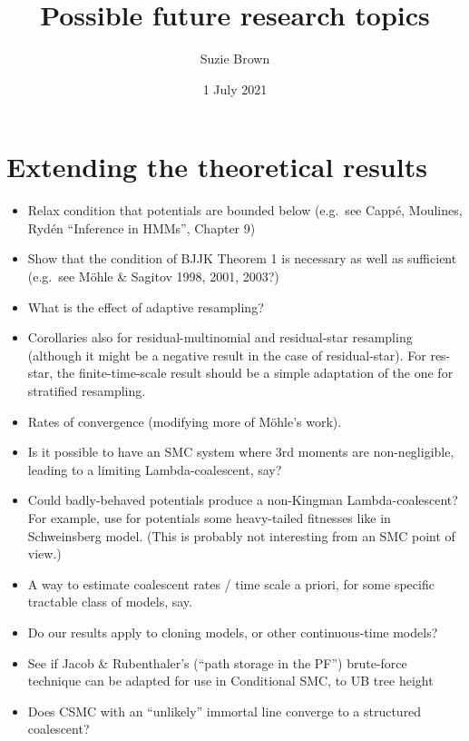 \documentclass{article}
\title{Possible future research topics}
\author{Suzie Brown}
\date{1 July 2021}
\begin{document}
\maketitle
\thispagestyle{fancy}

\section*{Extending the theoretical results}
\begin{itemize}
\item Relax condition that potentials are bounded below (e.g.\ see Capp\'e, Moulines, Ryd\'en ``Inference in HMMs'', Chapter 9)
\item Show that the condition of BJJK Theorem 1 is necessary as well as sufficient (e.g.\ see M\"ohle \& Sagitov 1998, 2001, 2003?)
\item What is the effect of adaptive resampling?
\item Corollaries also for residual-multinomial and residual-star resampling (although it might be a negative result in the case of residual-star). For res-star, the finite-time-scale result should be a simple adaptation of the one for stratified resampling.
\item Rates of convergence (modifying more of M\"ohle's work).
\item Is it possible to have an SMC system where 3rd moments are non-negligible, leading to a limiting Lambda-coalescent, say?
\item Could badly-behaved potentials produce a non-Kingman Lambda-coalescent? For example, use for potentials some heavy-tailed fitnesses like in Schweinsberg model. (This is probably not interesting from an SMC point of view.)
\item A way to estimate coalescent rates / time scale a priori, for some specific tractable class of models, say.
\item Do our results apply to cloning models, or other continuous-time models?
\item See if Jacob \& Rubenthaler's (``path storage in the PF'') brute-force technique can be adapted for use in Conditional SMC, to UB tree height
\item Does CSMC with an ``unlikely'' immortal line converge to a structured coalescent?
\end{itemize}
\end{document}
